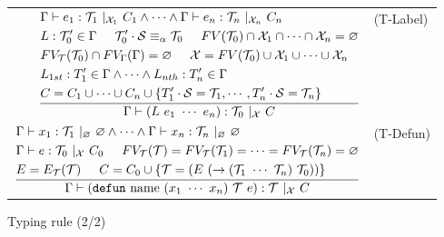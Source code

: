 \documentclass{article}
\begin{document}
\begin{figure}[tb]
\begin{tabular}{rlrl}
        \multicolumn{3}{r}{
        $\dfrac{
            \begin{aligned}
                &\Gamma \vdash e_1 : \mathcal{T}_1\ |_{\mathcal{X}_1}\ C_1 \land \cdots \land
                    \Gamma \vdash e_n : \mathcal{T}_n\ |_{\mathcal{X}_n}\ C_n \\
                &L : \mathcal{T}_0' \in \Gamma \hspace{5mm} \mathcal{T}_0' \cdot \mathcal{S}\equiv_\alpha \mathcal{T}_0 \hspace{5mm} FV(\mathcal{T}_0) \cap \mathcal{X}_1 \cap \cdots \cap \mathcal{X}_n = \varnothing \\
                &FV_\mathcal{T}(\mathcal{T}_0) \cap FV_\Gamma(\Gamma) = \varnothing \hspace{5mm}
                    \mathcal{X} = FV(\mathcal{T}_0) \cup \mathcal{X}_1 \cup \cdots \cup \mathcal{X}_n \\
                &L_{1st} : T_1' \in \Gamma \land \cdots \land L_{nth} : T_n' \in \Gamma \\
                &C = C_1 \cup \cdots \cup C_n \cup \{T_1' \cdot \mathcal{S} = \mathcal{T}_1, \cdots, T_n' \cdot \mathcal{S} = \mathcal{T}_n\} \\
            \end{aligned}
        }{
            \Gamma \vdash (L\ e_1\ \cdots\ e_n) : \mathcal{T}_0\ |_{\mathcal{X}}\ C
        }$} & (T-Label) \vspace{5mm} \\

        \multicolumn{3}{r}{
            $\dfrac{
                \begin{aligned}
                    &\Gamma \vdash x_1 : \mathcal{T}_1\ |_\varnothing\ \varnothing \land \cdots \land \Gamma \vdash x_n : \mathcal{T}_n\ |_\varnothing\ \varnothing \\
                    &\Gamma \vdash e : \mathcal{T}_0\ |_{\mathcal{X}}\ C_0 \hspace{5mm} FV_\mathcal{T}(\mathcal{T}) = FV_\mathcal{T}(\mathcal{T}_1) = \cdots = FV_\mathcal{T}(\mathcal{T}_n) = \varnothing \\
                    &E = E_\mathcal{T}(\mathcal{T}) \hspace{5mm} C = C_0 \cup \{\mathcal{T} = (E\ (\rightarrow (\mathcal{T}_1\ \cdots\ \mathcal{T}_n)\ \mathcal{T}_0)) \}
                \end{aligned}
            }{
                \Gamma \vdash (\mathtt{defun}\ \mathrm{name}\ (x_1\ \cdots\ x_n)\ \mathcal{T}\ e) : \mathcal{T}\ |_\mathcal{X}\ C
            }$
        } & (T-Defun)
    \end{tabular}
    \caption{Typing rule (2/2)}
\end{figure}
\end{document}
